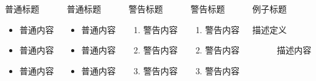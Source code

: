\documentclass[colortheme=light,algorithm,pgfplots]{njubeamer}
\begin{document}
    \begin{frame}
        \begin{columns}[T,onlytextwidth]
            \begin{block}{普通标题}
                \begin{itemize}
                    \item 普通内容
                    \item 普通内容
                    \item 普通内容
                \end{itemize}
            \end{block}
            \begin{block}{普通标题}
                \begin{itemize}
                    \item 普通内容
                    \item 普通内容
                    \item 普通内容
                \end{itemize}
            \end{block}
            \begin{alertblock}{警告标题}
                \begin{enumerate}
                    \item 警告内容
                    \item 警告内容
                    \item 警告内容
                \end{enumerate}
            \end{alertblock}
            \begin{alertblock}{警告标题}
                \begin{enumerate}
                    \item 警告内容
                    \item 警告内容
                    \item 警告内容
                \end{enumerate}
            \end{alertblock}
            \begin{exampleblock}{例子标题}
                \begin{description}
                    \item[描述定义] 描述内容

\end{description}
\end{exampleblock}
\end{columns}
\end{frame}
\end{document}
